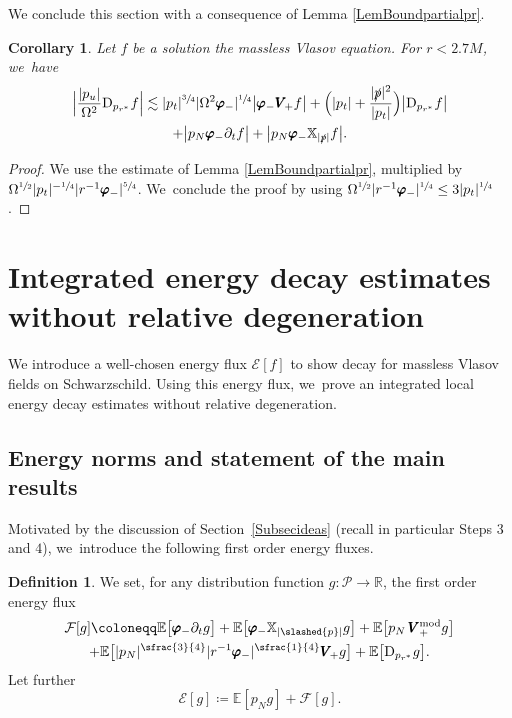 \documentclass[JEP,XML,SOM,Unicode,published]{cedram}
\theoremstyle{plain}
\newtheorem{corollary}[proposition]{Corollary}
\theoremstyle{definition}
\newtheorem{definition}[proposition]{Definition}
\newcommand\R{{\mathbb{R}}}
\newcommand\T{{\mathbb{X}}}
\begin{document}
We conclude this section with a consequence of Lemma \ref{LemBoundpartialpr}.

\begin{corollary}\label{CorBoundpartialpr}
Let $f$ be a solution the massless Vlasov equation. For $r < 2.7M$, we~have
\begin{multline*}
\Bigl| \frac{|p_u|}{\Omega^2} \mathrm{D}_{p_{r^*}} f \Bigr| \lesssim |p_t|^{\sfrac{3}{4}}|\Omega^2 \pmb{\varphi}_-|^{\sfrac{1}{4}} \big| \pmb{\varphi}_- \pmb{V}_{\! +} f \big|+ \Bigl(|p_t|+ \frac{|\slashed{p}|^2}{|p_t|}\Bigr) \big| \mathrm{D}_{p_{r^*}} f \big| \\
+ \big| p_N \pmb{\varphi}_-\partial_t f \big|+\big| p_N \pmb{\varphi}_- \T_{|\slashed{p}|} f \big|.
\end{multline*}
\end{corollary}
\begin{proof}
We use the estimate of Lemma \ref{LemBoundpartialpr}, multiplied by $\Omega^{\sfrac{1}{2}}|p_t|^{-\sfrac{1}{4}} |r^{-1} \pmb{\varphi}_-|^{\sfrac{5}{4}}$. We~conclude the proof by using $\Omega^{\sfrac{1}{2}} |r^{-1} \pmb{\varphi}_-|^{\sfrac{1}{4}} \leq 3|p_t|^{\sfrac{1}{4}}$.
\end{proof}

\section{Integrated energy decay estimates without relative degeneration}\label{SecILEDwrd}

We introduce a well-chosen energy flux $\mathcal{E}[f]$ to show decay for massless Vlasov fields on Schwarzschild. Using this energy flux, we~prove an integrated local energy decay estimates without relative degeneration.

\subsection{Energy norms and statement of the main results}

Motivated by the discussion of Section~\ref{Subsecideas} (recall in particular Steps $3$ and $4$), we~introduce the following first order energy fluxes.

\begin{definition}
We set, for any distribution function $g : \mathcal{P} \to \R$, the first order energy flux
\begin{multline*}
\mathcal{F}[g]\coloneqq \mathbb{E} \bigl[ \pmb{\varphi}_- \partial_t g \bigr]+\mathbb{E} \bigl[ \pmb{\varphi}_- \T_{|\slashed{p}|} g \bigr] + \mathbb{E} \bigl[ p_N \, \pmb{V}_+^{ \mathrm{mod}} g \bigr]\\
+\mathbb{E} \bigl[ |p_N|^{\sfrac{3}{4}} |r^{-1} \pmb{\varphi}_-|^{\sfrac{1}{4}} \pmb{V}_{\! +} g \bigr]+\mathbb{E} \bigl[\mathrm{D}_{p_{r^*}} g \bigr].
\end{multline*}
Let further
\[
\mathcal{E}[g]\coloneqq\mathbb{E}[p_Ng]+\mathcal{F}[g].
\]
\end{definition}
\end{document}
